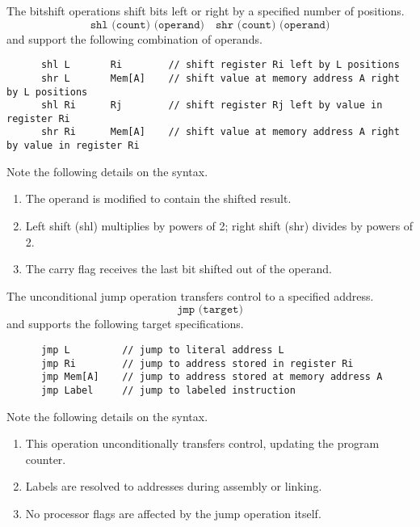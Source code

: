   \begin{definition}[Bitshift]
    The bitshift operations shift bits left or right by a specified number of positions.
    \begin{equation}
      \texttt{shl (count) (operand)} \quad \texttt{shr (count) (operand)}
    \end{equation}
    and support the following combination of operands.
    \begin{lstlisting}
      shl L       Ri        // shift register Ri left by L positions
      shr L       Mem[A]    // shift value at memory address A right by L positions
      shl Ri      Rj        // shift register Rj left by value in register Ri
      shr Ri      Mem[A]    // shift value at memory address A right by value in register Ri
    \end{lstlisting}
    Note the following details on the syntax.
    \begin{enumerate}
      \item The operand is modified to contain the shifted result.
      \item Left shift (shl) multiplies by powers of 2; right shift (shr) divides by powers of 2.
      \item The carry flag receives the last bit shifted out of the operand.
    \end{enumerate}
  \end{definition}

  \begin{definition}
    The unconditional jump operation transfers control to a specified address.
    \begin{equation}
      \texttt{jmp (target)}
    \end{equation}
    and supports the following target specifications.
    \begin{lstlisting}
      jmp L         // jump to literal address L
      jmp Ri        // jump to address stored in register Ri
      jmp Mem[A]    // jump to address stored at memory address A
      jmp Label     // jump to labeled instruction
    \end{lstlisting}
    Note the following details on the syntax.
    \begin{enumerate}
      \item This operation unconditionally transfers control, updating the program counter.
      \item Labels are resolved to addresses during assembly or linking.
      \item No processor flags are affected by the jump operation itself.
    \end{enumerate}
  \end{definition}


